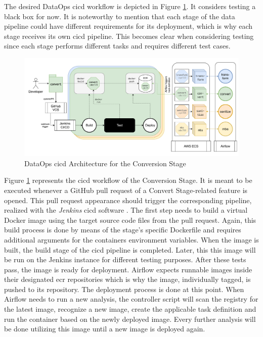 The desired DataOps \ac{cicd} workflow is depicted in Figure \ref{fig:5-cicd}. It considers testing a black box for now. It is noteworthy to mention that each stage of the data pipeline could have different requirements for its deployment, which is why each stage receives its own \ac{cicd} pipeline. This becomes clear when considering testing since each stage performs different tasks and requires different test cases.

\begin{figure}[h!]
	\centering
	\includegraphics[width=\linewidth]{main-matter/img/5-cicd.pdf}
	\caption{DataOps \acs{cicd} Architecture for the Conversion Stage}
	\label{fig:5-cicd}
\end{figure}

Figure \ref{fig:5-cicd} represents the \ac{cicd} workflow of the Conversion Stage. It is meant to be executed whenever a GitHub pull request of a Convert Stage-related feature is opened. This pull request appearance should trigger the corresponding pipeline, realized with the \textit{Jenkins} \ac{cicd} software \cite{jenkins}. The first step needs to build a virtual Docker image using the target source code files from the pull request. Again, this build process is done by means of the stage's specific Dockerfile and requires additional arguments for the containers environment variables. When the image is built, the build stage of the \ac{cicd} pipeline is completed. Later, this this image will be run on the Jenkins instance for different testing purposes. After these tests pass, the image is ready for deployment. Airflow expects runnable images inside their designated \ac{ecr} repositories which is why the image, individually tagged, is pushed to its repository. The deployment process is done at this point. When Airflow needs to run a new analysis, the controller script will scan the registry for the latest image, recognize a new image, create the applicable task definition and run the container based on the newly deployed image. Every further analysis will be done utilizing this image until a new image is deployed again.


